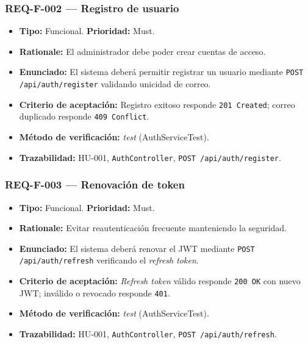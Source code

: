 \documentclass[12pt,a4paper]{article}
\begin{document}
\subsubsection{REQ-F-002 — Registro de usuario}
\begin{itemize}
  \item \textbf{Tipo:} Funcional. \textbf{Prioridad:} Must.
  \item \textbf{Rationale:} El administrador debe poder crear cuentas de acceso.
  \item \textbf{Enunciado:} El sistema deberá permitir registrar un usuario mediante
  \texttt{POST /api/auth/register} validando unicidad de correo.
  \item \textbf{Criterio de aceptación:} Registro exitoso responde \texttt{201 Created};
  correo duplicado responde \texttt{409 Conflict}.
  \item \textbf{Método de verificación:} \textit{test} (AuthServiceTest).
  \item \textbf{Trazabilidad:} HU-001, \texttt{AuthController}, \texttt{POST /api/auth/register}.
\end{itemize}

\subsubsection{REQ-F-003 — Renovación de token}
\begin{itemize}
  \item \textbf{Tipo:} Funcional. \textbf{Prioridad:} Must.
  \item \textbf{Rationale:} Evitar reautenticación frecuente manteniendo la seguridad.
  \item \textbf{Enunciado:} El sistema deberá renovar el JWT mediante
  \texttt{POST /api/auth/refresh} verificando el \textit{refresh token}.
  \item \textbf{Criterio de aceptación:} \textit{Refresh token} válido responde \texttt{200 OK}
  con nuevo JWT; inválido o revocado responde \texttt{401}.
  \item \textbf{Método de verificación:} \textit{test} (AuthServiceTest).
  \item \textbf{Trazabilidad:} HU-001, \texttt{AuthController}, \texttt{POST /api/auth/refresh}.
\end{itemize}
\end{document}
